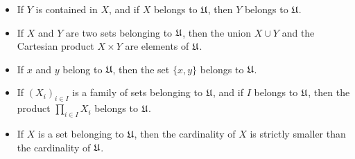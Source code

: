 \begin{itemize}
\item If $Y$ is contained in $X$, and if $X$ belongs to $\mathfrak{U}$, then $Y$
      belongs to $\mathfrak{U}$.
\item If $X$ and $Y$ are two sets belonging to $\mathfrak{U}$, then the union
      $X \cup Y$ and the Cartesian product $X \times Y$ are elements of
      $\mathfrak{U}$.
\item If $x$ and $y$ belong to $\mathfrak{U}$, then the set $\{x,y\}$ belongs to
      $\mathfrak{U}$.
\item If $(X_i)_{i\in I}$ is a family of sets belonging to $\mathfrak{U}$, and if
      $I$ belongs to $\mathfrak{U}$, then the product $\prod_{i\in I} X_i$ belongs
      to $\mathfrak{U}$.
\item If $X$ is a set belonging to $\mathfrak{U}$, then the cardinality of $X$ is
      strictly smaller than the cardinality of $\mathfrak{U}$.
\end{itemize}